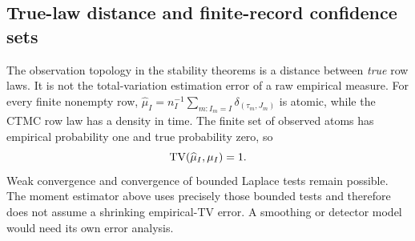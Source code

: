 
\subsection{True-law distance and finite-record confidence sets}
\label{subsec:empirical-topology}

The observation topology in the stability theorems is a distance between
\emph{true} row laws. It is not the total-variation estimation error of a raw
empirical measure. For every finite nonempty row,
$\widehat\mu_I=n_I^{-1}\sum_{m:I_m=I}\delta_{(\tau_m,J_m)}$ is atomic, while
the CTMC row law has a density in time. The finite set of observed atoms has
empirical probability one and true probability zero, so
\begin{equation}
 \operatorname{TV}(\widehat\mu_I,\mu_I)=1.\label{eq:empirical-tv-one}
\end{equation}
Weak convergence and convergence of bounded Laplace tests remain possible.
The moment estimator above uses precisely those bounded tests and therefore
does not assume a shrinking empirical-TV error. A smoothing or detector model
would need its own error analysis.

